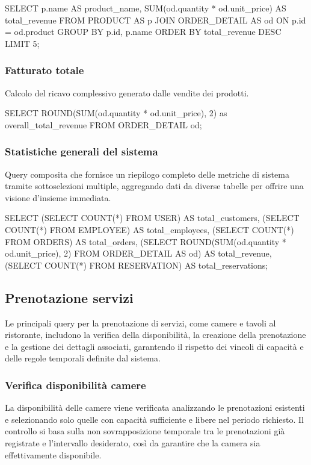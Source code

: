 \documentclass[a4paper,12pt]{report}
\begin{document}
\begin{sqlcode}[caption={}]
SELECT
  p.name AS product_name,
  SUM(od.quantity * od.unit_price) AS total_revenue
FROM PRODUCT AS p
JOIN ORDER_DETAIL AS od ON p.id = od.product
GROUP BY p.id, p.name
ORDER BY total_revenue DESC
LIMIT 5;
\end{sqlcode}

\subsubsection{Fatturato totale}
Calcolo del ricavo complessivo generato dalle vendite dei prodotti.

\begin{sqlcode}[caption={}]
SELECT ROUND(SUM(od.quantity * od.unit_price), 2) as overall_total_revenue
FROM ORDER_DETAIL od;
\end{sqlcode}

\subsubsection{Statistiche generali del sistema}
Query composita che fornisce un riepilogo completo delle metriche di
sistema tramite sottoselezioni multiple, aggregando dati da diverse
tabelle per offrire una visione d'insieme immediata.

\begin{sqlcode}[caption={}]
SELECT
  (SELECT COUNT(*) FROM USER) AS total_customers,
  (SELECT COUNT(*) FROM EMPLOYEE) AS total_employees,
  (SELECT COUNT(*) FROM ORDERS) AS total_orders,
  (SELECT ROUND(SUM(od.quantity * od.unit_price), 2) FROM ORDER_DETAIL AS od) AS total_revenue,
  (SELECT COUNT(*) FROM RESERVATION) AS total_reservations;
\end{sqlcode}

\newpage
\subsection{Prenotazione servizi}
Le principali query per la prenotazione di servizi, come camere e
tavoli al ristorante, includono la verifica della disponibilità, la
creazione della prenotazione e la gestione dei dettagli associati,
garantendo il rispetto dei vincoli di capacità e delle regole
temporali definite dal sistema.

\subsubsection{Verifica disponibilità camere}
La disponibilità delle camere viene verificata analizzando le
prenotazioni esistenti e selezionando solo quelle con capacità
sufficiente e libere nel periodo richiesto. Il controllo si basa
sulla non sovrapposizione temporale tra le prenotazioni già
registrate e l'intervallo desiderato, così da garantire che la camera
sia effettivamente disponibile.
\end{document}
